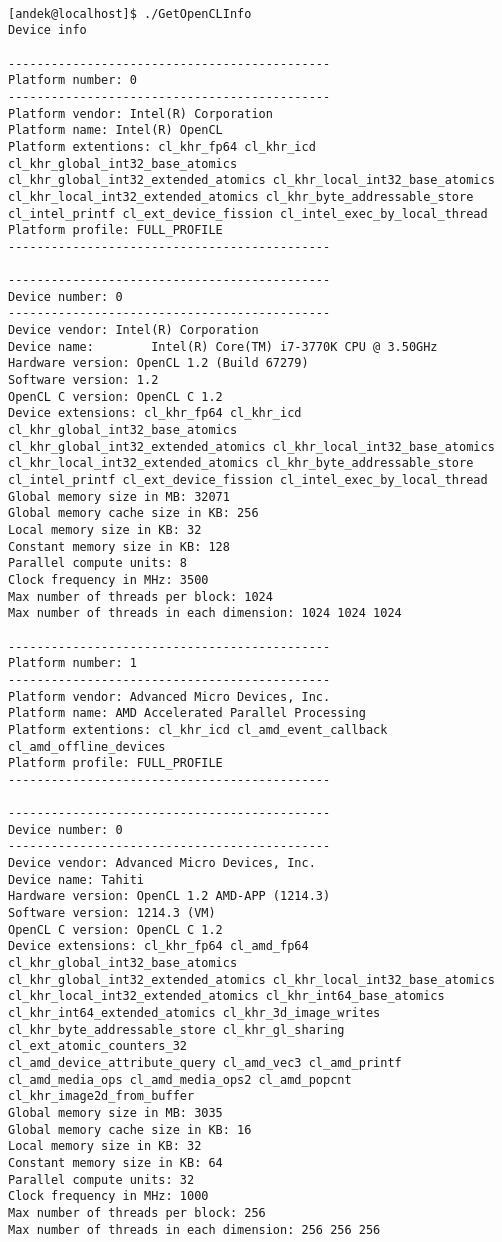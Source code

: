 \begin{verbatim}

[andek@localhost]$ ./GetOpenCLInfo 
Device info 
 
---------------------------------------------
Platform number: 0
---------------------------------------------
Platform vendor: Intel(R) Corporation
Platform name: Intel(R) OpenCL
Platform extentions: cl_khr_fp64 cl_khr_icd cl_khr_global_int32_base_atomics 
cl_khr_global_int32_extended_atomics cl_khr_local_int32_base_atomics 
cl_khr_local_int32_extended_atomics cl_khr_byte_addressable_store 
cl_intel_printf cl_ext_device_fission cl_intel_exec_by_local_thread 
Platform profile: FULL_PROFILE
---------------------------------------------

---------------------------------------------
Device number: 0
---------------------------------------------
Device vendor: Intel(R) Corporation
Device name:        Intel(R) Core(TM) i7-3770K CPU @ 3.50GHz
Hardware version: OpenCL 1.2 (Build 67279)
Software version: 1.2
OpenCL C version: OpenCL C 1.2 
Device extensions: cl_khr_fp64 cl_khr_icd cl_khr_global_int32_base_atomics 
cl_khr_global_int32_extended_atomics cl_khr_local_int32_base_atomics 
cl_khr_local_int32_extended_atomics cl_khr_byte_addressable_store 
cl_intel_printf cl_ext_device_fission cl_intel_exec_by_local_thread 
Global memory size in MB: 32071
Global memory cache size in KB: 256
Local memory size in KB: 32
Constant memory size in KB: 128
Parallel compute units: 8
Clock frequency in MHz: 3500
Max number of threads per block: 1024
Max number of threads in each dimension: 1024 1024 1024

---------------------------------------------
Platform number: 1
---------------------------------------------
Platform vendor: Advanced Micro Devices, Inc.
Platform name: AMD Accelerated Parallel Processing
Platform extentions: cl_khr_icd cl_amd_event_callback cl_amd_offline_devices
Platform profile: FULL_PROFILE
---------------------------------------------

---------------------------------------------
Device number: 0
---------------------------------------------
Device vendor: Advanced Micro Devices, Inc.
Device name: Tahiti
Hardware version: OpenCL 1.2 AMD-APP (1214.3)
Software version: 1214.3 (VM)
OpenCL C version: OpenCL C 1.2 
Device extensions: cl_khr_fp64 cl_amd_fp64 cl_khr_global_int32_base_atomics 
cl_khr_global_int32_extended_atomics cl_khr_local_int32_base_atomics 
cl_khr_local_int32_extended_atomics cl_khr_int64_base_atomics 
cl_khr_int64_extended_atomics cl_khr_3d_image_writes 
cl_khr_byte_addressable_store cl_khr_gl_sharing cl_ext_atomic_counters_32 
cl_amd_device_attribute_query cl_amd_vec3 cl_amd_printf 
cl_amd_media_ops cl_amd_media_ops2 cl_amd_popcnt cl_khr_image2d_from_buffer 
Global memory size in MB: 3035
Global memory cache size in KB: 16
Local memory size in KB: 32
Constant memory size in KB: 64
Parallel compute units: 32
Clock frequency in MHz: 1000
Max number of threads per block: 256
Max number of threads in each dimension: 256 256 256


\end{verbatim}

